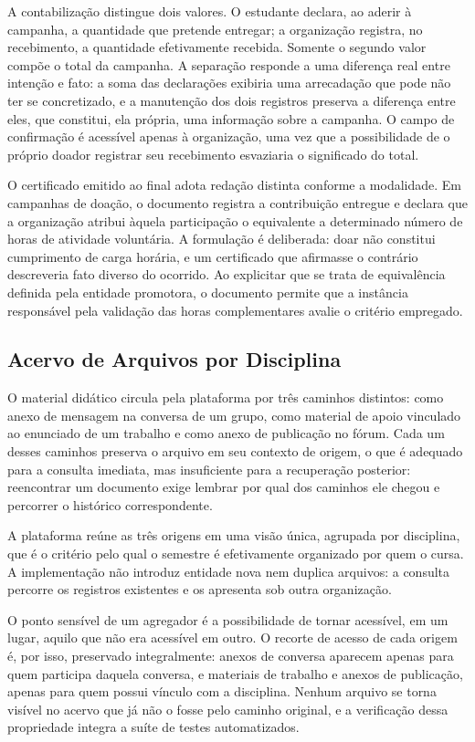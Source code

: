 A contabilização distingue dois valores. O estudante declara, ao aderir à
campanha, a quantidade que pretende entregar; a organização registra, no
recebimento, a quantidade efetivamente recebida. Somente o segundo valor
compõe o total da campanha. A separação responde a uma diferença real entre
intenção e fato: a soma das declarações exibiria uma arrecadação que pode não
ter se concretizado, e a manutenção dos dois registros preserva a diferença
entre eles, que constitui, ela própria, uma informação sobre a campanha. O
campo de confirmação é acessível apenas à organização, uma vez que a
possibilidade de o próprio doador registrar seu recebimento esvaziaria o
significado do total.

O certificado emitido ao final adota redação distinta conforme a modalidade.
Em campanhas de doação, o documento registra a contribuição entregue e declara
que a organização atribui àquela participação o equivalente a determinado
número de horas de atividade voluntária. A formulação é deliberada: doar não
constitui cumprimento de carga horária, e um certificado que afirmasse o
contrário descreveria fato diverso do ocorrido. Ao explicitar que se trata de
equivalência definida pela entidade promotora, o documento permite que a
instância responsável pela validação das horas complementares avalie o
critério empregado.

\subsection{Acervo de Arquivos por Disciplina}
\label{acervo}

O material didático circula pela plataforma por três caminhos distintos: como
anexo de mensagem na conversa de um grupo, como material de apoio vinculado ao
enunciado de um trabalho e como anexo de publicação no fórum. Cada um desses
caminhos preserva o arquivo em seu contexto de origem, o que é adequado para a
consulta imediata, mas insuficiente para a recuperação posterior: reencontrar
um documento exige lembrar por qual dos caminhos ele chegou e percorrer o
histórico correspondente.

A plataforma reúne as três origens em uma visão única, agrupada por disciplina,
que é o critério pelo qual o semestre é efetivamente organizado por quem o
cursa. A implementação não introduz entidade nova nem duplica arquivos: a
consulta percorre os registros existentes e os apresenta sob outra
organização.

O ponto sensível de um agregador é a possibilidade de tornar acessível, em um
lugar, aquilo que não era acessível em outro. O recorte de acesso de cada
origem é, por isso, preservado integralmente: anexos de conversa aparecem
apenas para quem participa daquela conversa, e materiais de trabalho e anexos
de publicação, apenas para quem possui vínculo com a disciplina. Nenhum arquivo
se torna visível no acervo que já não o fosse pelo caminho original, e a
verificação dessa propriedade integra a suíte de testes automatizados.

